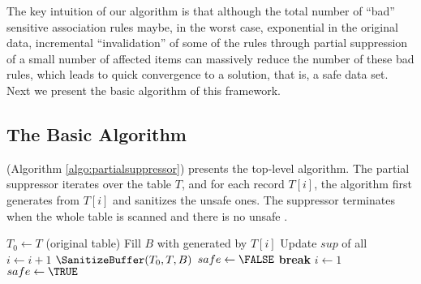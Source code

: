 The key intuition of our algorithm is that although the total number of
``bad'' sensitive association rules
maybe, in the worst case, exponential in the original data, incremental
``invalidation'' of some of the rules through partial suppression of a
small number of affected items can massively reduce the number of these bad
rules, which leads to quick convergence to a solution, that is, a
safe data set.
%
Next we present the basic algorithm of this framework.

\subsection{The Basic Algorithm}
\label{sec:basic}

\PartialSuppressor (Algorithm \ref{algo:partialsuppressor}) presents the
top-level algorithm. The partial suppressor iterates over the table $T$, and
for each record $T[i]$, the algorithm first generates  \qids from $T[i]$ and
sanitizes the unsafe ones. The suppressor terminates when the whole table is
scanned and there is no unsafe \qid.

\begin{algorithm}[h]
\small
\caption{$\PartialSuppressor(T,\bmax)$}
\label{algo:partialsuppressor}
\begin{algorithmic}[1]
\STATE $T_0 \gets T$ (original table)
    \LOOP
         \label{algo:enu_s}
             \STATE Fill $B$ with \qids generated by $T[i]$ \label{algo:enumerate1}
             \STATE Update $sup$ of all \qids \label{algo:enumerate2}
             \STATE $i\leftarrow i+1$
        \ENDWHILE \label{algo:enu_e}
        \label{line:containunsafe}
            \STATE $\SanitizeBuffer(T_0, T, B)$\label{line:sanitizebuffer}
            \STATE $safe\leftarrow\FALSE$
        \ENDIF
            \STATE \textbf{break}\label{algo:partialbreak}
                \STATE $i\leftarrow 1$
                \STATE $safe\leftarrow\TRUE$
        \ENDIF
    \ENDLOOP
\end{algorithmic}
\end{algorithm}

